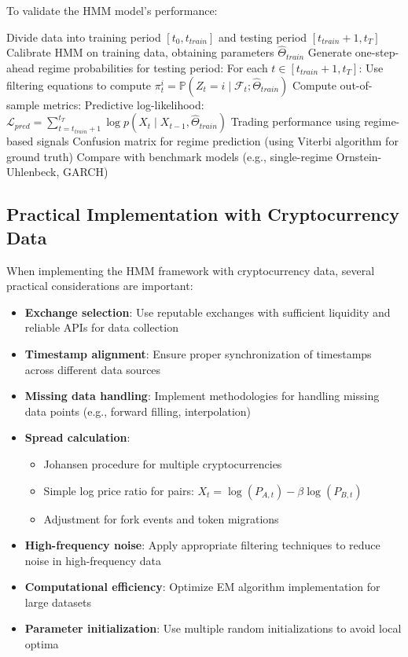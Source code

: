 \documentclass{article}
\begin{document}
To validate the HMM model's performance:

\begin{algorithm}
\caption{Out-of-Sample Testing for HMM}
\begin{algorithmic}[1]
\STATE Divide data into training period $[t_0, t_{train}]$ and testing period $[t_{train}+1, t_T]$
\STATE Calibrate HMM on training data, obtaining parameters $\hat{\Theta}_{train}$
\STATE Generate one-step-ahead regime probabilities for testing period:
    \STATE \quad For each $t \in [t_{train}+1, t_T]$:
    \STATE \quad \quad Use filtering equations to compute $\pi_t^i = \mathbb{P}(Z_t = i \mid \mathcal{F}_t; \hat{\Theta}_{train})$
\STATE Compute out-of-sample metrics:
    \STATE \quad Predictive log-likelihood: $\mathcal{L}_{pred} = \sum_{t=t_{train}+1}^{t_T} \log p(X_t \mid X_{t-1}, \hat{\Theta}_{train})$
    \STATE \quad Trading performance using regime-based signals
    \STATE \quad Confusion matrix for regime prediction (using Viterbi algorithm for ground truth)
\STATE Compare with benchmark models (e.g., single-regime Ornstein-Uhlenbeck, GARCH)
\end{algorithmic}
\end{algorithm}

\subsection{Practical Implementation with Cryptocurrency Data}

When implementing the HMM framework with cryptocurrency data, several practical considerations are important:

\begin{itemize}
    \item \textbf{Exchange selection}: Use reputable exchanges with sufficient liquidity and reliable APIs for data collection
    \item \textbf{Timestamp alignment}: Ensure proper synchronization of timestamps across different data sources
    \item \textbf{Missing data handling}: Implement methodologies for handling missing data points (e.g., forward filling, interpolation)
    \item \textbf{Spread calculation}:
        \begin{itemize}
            \item Johansen procedure for multiple cryptocurrencies
            \item Simple log price ratio for pairs: $X_t = \log(P_{A,t}) - \beta \log(P_{B,t})$
            \item Adjustment for fork events and token migrations
        \end{itemize}
    \item \textbf{High-frequency noise}: Apply appropriate filtering techniques to reduce noise in high-frequency data
    \item \textbf{Computational efficiency}: Optimize EM algorithm implementation for large datasets
    \item \textbf{Parameter initialization}: Use multiple random initializations to avoid local optima
\end{itemize}
\end{document}
